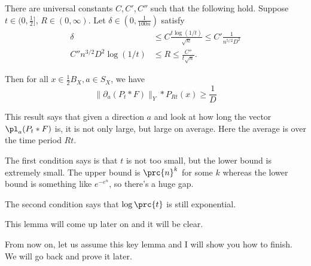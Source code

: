 \begin{lem}
There are universal constants $C,C',C''$ such that the following hold.
Suppose $t \in (0, \frac{1}{2}]$, $R \in (0, \infty)$. 
Let $\delta \in (0, \frac{1}{100n})$ satisfy 
\begin{align}
\delta &\leq C \frac{t\log(1/t)}{\sqrt{n}} \leq C' \frac{1}{n^{5/2}D^2}
\label{eq:bdt1-1}
\\
\label{eq:bdt1-2}
 C''n^{3/2}D^2\log(1/t) &\leq R \leq \frac{C''}{t\sqrt{n}}.
\end{align}
%
%
%
%
%

Then for all $x \in \frac{1}{2} B_X, a \in S_X$, we have
\[
\|\partial_a(P_t*F)\|_Y * P_{Rt}(x) \ge \frac{1}{D}
\]
\end{lem}
This result says that given a direction $a$ and look at how long the vector $\pl_a (P_t*F)$ is, it is not only large, but large on average. Here the average is over the time period $Rt$. 

The first condition says is that $t$ is not too small, but the lower bound is extremely small. The upper bound is $\prc{n}^{k}$ for some $k$ whereas the lower bound is something like $e^{-e^{n}}$, so there's a huge gap. %

The second condition says that $\log\prc{t}$ is still exponential. 


This lemma will come up later on and it will be clear. 

From now on, let us assume this key lemma and I will show you how to finish. We will go back and prove it later. 

